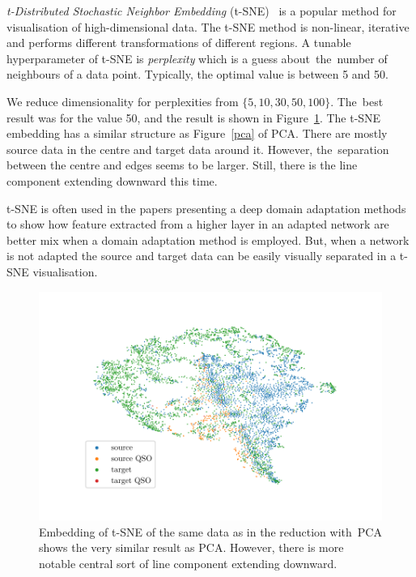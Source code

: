 \textit{t-Distributed Stochastic Neighbor Embedding} (t-SNE)~\cite{maaten2008, wattenberg2016} is a popular method for visualisation of high-dimensional data.
The t-SNE method is non-linear, iterative
and performs different transformations of different regions.
A tunable hyperparameter of t-SNE is \textit{perplexity}
which is a guess about~the~number of neighbours of a data point.
Typically, the optimal value is between 5 and 50.

We reduce dimensionality for perplexities from \(\{5, 10, 30, 50, 100\}\).
The~best result was for the value 50,
and the result is shown in Figure~\ref{tsne}.
The t-SNE embedding has a similar structure as Figure~\ref{pca} of PCA.
There are mostly source data in the centre and target data around it.
However, the~separation between the centre and edges seems to be larger.
Still, there is the line component extending downward this time.

t-SNE is often used in the papers presenting a deep domain adaptation methods
to show how feature extracted from a higher layer in an adapted network
are better mix when a domain adaptation method is employed.
But, when a network is not adapted the source and target data
can be easily visually separated in a t-SNE visualisation.

\begin{figure}
\includegraphics[width=\textwidth]{img/tsne.pdf}
\caption[t-SNE visualisation of source and target data distributions]{
	Embedding of t-SNE of the same data
	as in the reduction with~PCA shows the very similar result as PCA.
	However, there is more notable central sort of line component
	extending downward.
	}
\label{tsne}
\end{figure}

